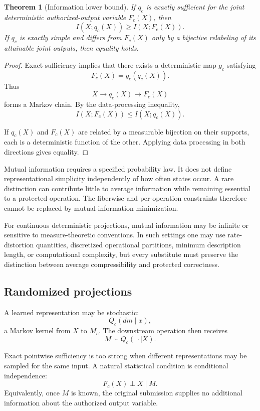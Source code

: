 \documentclass[11pt]{article}
\newtheorem{theorem}[definition]{Theorem}
\theoremstyle{definition}
\begin{document}
\begin{theorem}[Information lower bound]
If \(q_c\) is exactly sufficient for the joint deterministic authorized-output variable \(F_c(X)\), then
\[
I(X;q_c(X))
\geq
I(X;F_c(X)).
\]
If \(q_c\) is exactly simple and differs from \(F_c(X)\) only by a bijective relabeling of its attainable joint outputs, then equality holds.
\end{theorem}

\begin{proof}
Exact sufficiency implies that there exists a deterministic map \(g_c\) satisfying
\[
F_c(X)=g_c(q_c(X)).
\]
Thus
\[
X\longrightarrow q_c(X)\longrightarrow F_c(X)
\]
forms a Markov chain. By the data-processing inequality,
\[
I(X;F_c(X))
\leq
I(X;q_c(X)).
\]

If \(q_c(X)\) and \(F_c(X)\) are related by a measurable bijection on their supports, each is a deterministic function of the other. Applying data processing in both directions gives equality.
\end{proof}

Mutual information requires a specified probability law. It does not define representational simplicity independently of how often states occur. A rare distinction can contribute little to average information while remaining essential to a protected operation. The fiberwise and per-operation constraints therefore cannot be replaced by mutual-information minimization.

For continuous deterministic projections, mutual information may be infinite or sensitive to measure-theoretic conventions. In such settings one may use rate-distortion quantities, discretized operational partitions, minimum description length, or computational complexity, but every substitute must preserve the distinction between average compressibility and protected correctness.

\subsection{Randomized projections}

A learned representation may be stochastic:
\[
Q_c(dm\mid x),
\]
a Markov kernel from \(X\) to \(M_c\). The downstream operation then receives
\[
M\sim Q_c(\,\cdot\mid X).
\]

Exact pointwise sufficiency is too strong when different representations may be sampled for the same input. A natural statistical condition is conditional independence:
\[
F_c(X)\perp X\mid M.
\]
Equivalently, once \(M\) is known, the original submission supplies no additional information about the authorized output variable.
\end{document}
